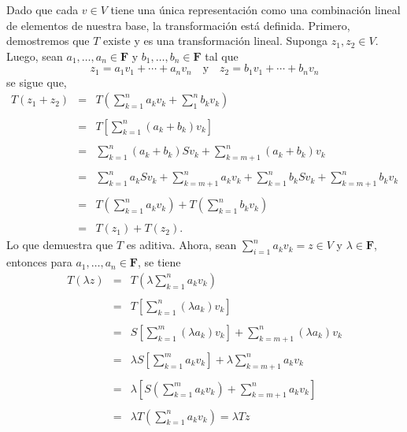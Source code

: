 \begin{enumerate}[\bfseries 1.]
	Dado que cada $v\in V$ tiene una única representación como una combinación lineal de elementos de nuestra base, la transformación está definida. Primero, demostremos que $T$ existe y  es una transformación lineal. Suponga $z_1,z_2\in V$. Luego, sean $a_1,\ldots,a_n\in \textbf{F}$ y $b_{1},\ldots,b_{n}\in \textbf{F}$ tal que
	$$z_1=a_1v_1+\cdots+a_nv_n \quad \mbox{y}\quad z_2=b_{1}v_{1}+\cdots+b_nv_{n}$$
	se sigue que,
	$$
	\begin{array}{rcl}
	    T(z_1+z_2) &=& T\left(\displaystyle\sum_{k=1}^n a_kv_k+\sum_{1}^n b_kv_k\right)\\\\
		       &=& T\left[\displaystyle\sum_{k=1}^n (a_k+b_k)v_k\right]\\\\
		       &=& \displaystyle\sum_{k=1}^n (a_k+b_k)Sv_k+\sum_{k=m+1}^n (a_k+b_k)v_k\\\\
		       &=& \displaystyle\sum_{k=1}^n a_kSv_k+\sum_{k=m+1}^n a_kv_k+\sum_{k=1}^n b_kSv_k+\sum_{k=m+1}^n b_kv_k\\\\
		       &=& T\left(\displaystyle\sum_{k=1}^n a_kv_k\right)+T\left(\displaystyle\sum_{k=1}^n b_kv_k\right)\\\\
		       &=& T(z_1)+T(z_2).
	\end{array}
	$$
	Lo que demuestra que $T$ es aditiva. Ahora, sean $\sum_{i=1}^n a_kv_k=z\in V$ y $\lambda\in \textbf{F}$, entonces para  $a_1,\ldots,a_n \in \textbf{F}$, se tiene
	$$
	\begin{array}{rcl}
	    T(\lambda z) &=& T\left(\lambda\displaystyle\sum_{k=1}^n a_kv_k\right)\\\\
			 &=& T\left[\displaystyle\sum_{k=1}^n (\lambda a_k)v_k\right]\\\\
			 &=& S\left[\displaystyle\sum_{k=1}^m (\lambda a_k)v_k\right]+\displaystyle\sum_{k=m+1}^n (\lambda a_k)v_k\\\\
			 &=& \lambda S\left[\displaystyle\sum_{k=1}^m a_kv_k\right]+\lambda\displaystyle\sum_{k=m+1}^n a_kv_k\\\\
			 &=& \lambda \left[S\left(\displaystyle\sum_{k=1}^m a_kv_k\right)+\displaystyle\sum_{k=m+1}^n a_kv_k\right]\\\\
			 &=& \lambda T\left(\displaystyle\sum_{k=1}^n a_kv_k\right)=\lambda Tz\\\\

\end{array}$$
\end{enumerate}
